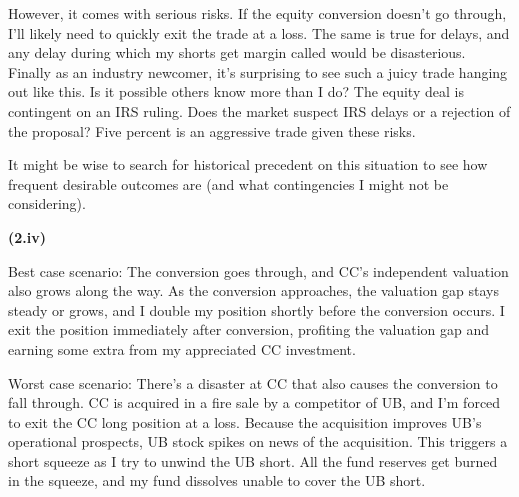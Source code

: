 \documentclass[11pt]{article}
\begin{document}
However, it comes with serious risks. If the equity conversion doesn't go through, I'll likely need to quickly exit the trade at a loss. The same is true for delays, and any delay during which my shorts get margin called would be disasterious. Finally as an industry newcomer, it's surprising to see such a juicy trade hanging out like this. Is it possible others know more than I do? The equity deal is contingent on an IRS ruling. Does the market suspect IRS delays or a rejection of the proposal? Five percent is an aggressive trade given these risks.

It might be wise to search for historical precedent on this situation to see how frequent desirable outcomes are (and what contingencies I might not be considering).

\textbf{(2.iv)}

Best case scenario: The conversion goes through, and CC's independent valuation also grows along the way. As the conversion approaches, the valuation gap stays steady or grows, and I double my position shortly before the conversion occurs. I exit the position immediately after conversion, profiting the valuation gap and earning some extra from my appreciated CC investment. 

Worst case scenario: There's a disaster at CC that also causes the conversion to fall through. CC is acquired in a fire sale by a competitor of UB, and I'm forced to exit the CC long position at a loss. Because the acquisition improves UB's operational prospects, UB stock spikes on news of the acquisition. This triggers a short squeeze as I try to unwind the UB short. All the fund reserves get burned in the squeeze, and my fund dissolves unable to cover the UB short.  
\end{document}

